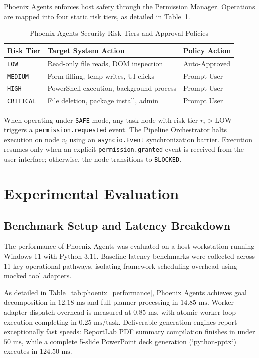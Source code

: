 \documentclass[conference]{IEEEtran}
\begin{document}
Phoenix Agents enforces host safety through the Permission Manager. Operations are mapped into four static risk tiers, as detailed in Table~\ref{tab:permission_matrix_phoenix}.

\begin{table}[htbp]
\caption{Phoenix Agents Security Risk Tiers and Approval Policies}
\label{tab:permission_matrix_phoenix}
\centering
\begin{tabular}{p{1.4cm} p{4.2cm} p{1.8cm}}
\toprule
\textbf{Risk Tier} & \textbf{Target System Action} & \textbf{Policy Action} \\
\midrule
\texttt{LOW} & Read-only file reads, DOM inspection & Auto-Approved \\
\texttt{MEDIUM} & Form filling, temp writes, UI clicks & Prompt User \\
\texttt{HIGH} & PowerShell execution, background process & Prompt User \\
\texttt{CRITICAL} & File deletion, package install, admin & Prompt User \\
\bottomrule
\end{tabular}
\end{table}

When operating under \texttt{SAFE} mode, any task node with risk tier $r_i > \text{LOW}$ triggers a \texttt{permission.requested} event. The Pipeline Orchestrator halts execution on node $v_i$ using an \texttt{asyncio.Event} synchronization barrier. Execution resumes only when an explicit \texttt{permission.granted} event is received from the user interface; otherwise, the node transitions to \texttt{BLOCKED}.

\section{Experimental Evaluation}
\label{sec:experiments}

\subsection{Benchmark Setup and Latency Breakdown}
The performance of Phoenix Agents was evaluated on a host workstation running Windows 11 with Python 3.11. Baseline latency benchmarks were collected across 11 key operational pathways, isolating framework scheduling overhead using mocked tool adapters.

As detailed in Table~\ref{tab:phoenix_performance}, Phoenix Agents achieves goal decomposition in $12.18\text{ ms}$ and full planner processing in $14.85\text{ ms}$. Worker adapter dispatch overhead is measured at $0.85\text{ ms}$, with atomic worker loop execution completing in $0.25\text{ ms/task}$. Deliverable generation engines report exceptionally fast speeds: ReportLab PDF summary compilation finishes in under $50\text{ ms}$, while a complete 5-slide PowerPoint deck generation (`python-pptx`) executes in $124.50\text{ ms}$.
\end{document}
